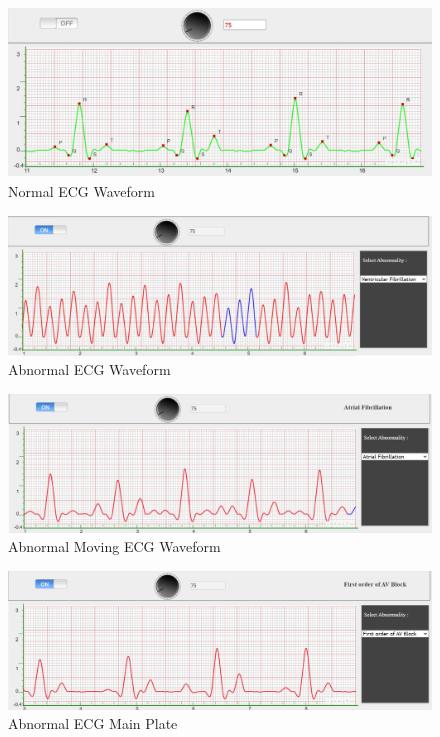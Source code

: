 \documentclass[
  11pt,
  letterpaper,
  DIV=11,
  numbers=noendperiod]{scrreprt}
\begin{document}
\begin{figure}[H]

{\centering \includegraphics{images/clipboard-2660105563.png}

}

\caption{Normal ECG Waveform}

\end{figure}%
\begin{figure}[H]

{\centering \includegraphics{images/clipboard-2256462463.png}

}

\caption{Abnormal ECG Waveform}

\end{figure}%
\begin{figure}[H]

{\centering \includegraphics{images/clipboard-2993141644.png}

}

\caption{Abnormal Moving ECG Waveform}

\end{figure}%
\begin{figure}[H]

{\centering \includegraphics{images/clipboard-3470925149.png}

}

\caption{Abnormal ECG Main Plate}

\end{figure}%
\end{document}
